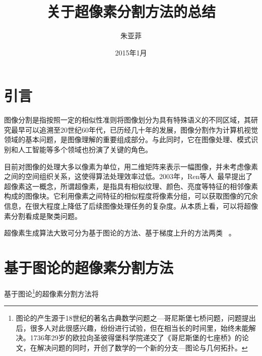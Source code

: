 \documentclass[12pt]{article}
\begin{document}
\title{\vspace{-2em}关于超像素分割方法的总结\vspace{-0.7em}}
\author{朱亚菲}
\date{\vspace{-0.7em}2015年1月\vspace{-0.7em}}
\maketitle\thispagestyle{fancy}
\maketitle
\tableofcontents 


\section{引言}

图像分割是指按照一定的相似性准则将图像划分为具有特殊语义的不同区域，其研究最早可以追溯至20世纪60年代，已历经几十年的发展，图像分割作为计算机视觉领域的基本问题，是图像理解的重要组成部分。与此同时，它在图像处理、模式识别和人工智能等多个领域也扮演了关键的角色。

目前对图像的处理大多以像素为单位，用二维矩阵来表示一幅图像，并未考虑像素之间的空间组织关系，这使得算法处理效率过低。2003年，Ren等人~\cite{ren2003learning}最早提出了超像素这一概念，所谓超像素，是指具有相似纹理、颜色、亮度等特征的相邻像素构成的图像块。它利用像素之间特征的相似程度将像素分组，可以获取图像的冗余信息，在很大程度上降低了后续图像处理任务的复杂度。从本质上看，可以将超像素分割看成是聚类问题。

超像素生成算法大致可分为基于图论的方法、基于梯度上升的方法两类~\cite{achanta2012slic} 。

\section{基于图论的超像素分割方法}

基于图论\footnote{图论的产生源于18世纪的著名古典数学问题之---哥尼斯堡七桥问题，问题提出后，很多人对此很感兴趣，纷纷进行试验，但在相当长的时间里，始终未能解决。1736年29岁的欧拉向圣彼得堡科学院递交了《哥尼斯堡的七座桥》的论文，在解决问题的同时，开创了数学的一个新的分支---图论与几何拓扑。}的超像素分割方法将
\end{document}
